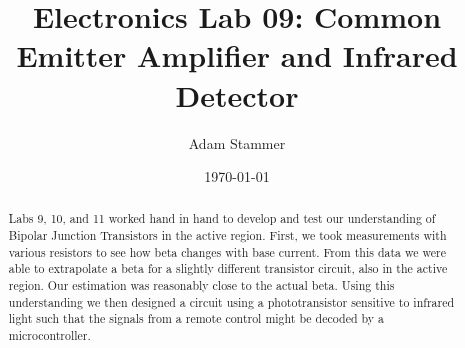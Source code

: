 \documentclass[prb,preprint]{revtex4-1}
\begin{document}
\title{Electronics Lab 09: Common Emitter Amplifier and Infrared Detector}
\author{Adam Stammer}

\date{\today}

\begin{abstract}
Labs 9, 10, and 11 worked hand in hand to develop and test our understanding of Bipolar Junction Transistors in the active region. First, we took measurements with various resistors to see how beta changes with base current. From this data we were able to extrapolate a beta for a slightly different transistor circuit, also in the active region. Our estimation was reasonably close to the actual beta. Using this understanding we then designed a circuit using a phototransistor sensitive to infrared light such that the signals from a remote control might be decoded by a microcontroller. 
\end{abstract}

\maketitle


%
%
%
%
%
%
%
%
\end{document}
